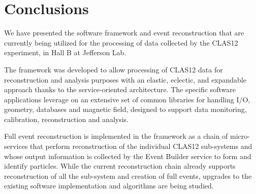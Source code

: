 \section{Conclusions}

We have presented the software framework and event reconstruction that are currently being utilized for the processing of data collected by the CLAS12 experiment, in Hall B at Jefferson Lab.  

The framework was developed to allow processing of CLAS12 data for reconstruction and analysis purposes with an elastic, eclectic, and expandable approach thanks to the service-oriented architecture. The specific software applications leverage on an extensive set of common libraries for handling I/O, geometry, databases and magnetic field, designed to support data monitoring, calibration, reconstruction and analysis.

Full event reconstruction is implemented in the framework as a chain of micro-services that perform reconstruction of the individual CLAS12 sub-systems and whose output information is collected by the Event Builder service to form and identify particles. While the current reconstruction chain already supports reconstruction of all the sub-system and creation of full events, upgrades to the existing software implementation and algorithms are being studied.